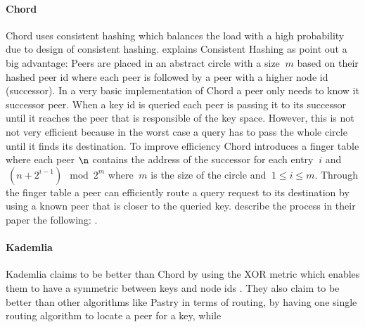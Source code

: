 \paragraph{Chord}
Chord uses consistent hashing which balances the load with a high probability due to design of consistent hashing. \citet{consistentHashing} explains Consistent Hashing as  \citet[\S4.2]{chord} point out a big advantage: 
Peers are placed in an abstract circle with a size $\ m $ based on their hashed peer id where each peer is followed by a peer with a higher node id (successor). In a very basic implementation of Chord a peer only needs to know it successor peer. When a key id is queried each peer is passing it to its successor until it reaches the peer that is responsible of the key space. However, this is not not very efficient because in the worst case a query has to pass the whole circle until it finds its destination. To improve efficiency Chord introduces a finger table where each peer $\n$ contains the address of the successor for each entry $\ i $ and $\ (n + 2^{i-1}) \mod 2^m $ where $\ m $ is the size of the circle and $\ 1 \leq i \leq m$. Through the finger table a peer can efficiently route a query request to its destination by using a known peer that is closer to the queried key. \citet[\S4.3]{chord} describe the process in their paper the following: .

\paragraph{Kademlia}
Kademlia claims to be better than Chord by using the XOR metric which enables them to have a symmetric between keys and node ids \cite[\S1]{kademlia}. They also claim to be better than other algorithms like Pastry in terms of routing, by having one single routing algorithm to locate a peer for a key, while \cite[\S1]{kademlia}






